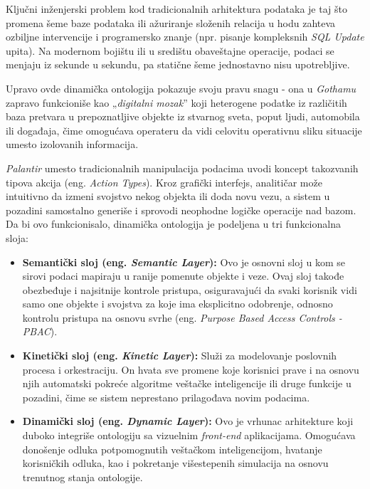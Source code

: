 ﻿\documentclass[12pt]{article}
\begin{document}
Ključni inženjerski problem kod tradicionalnih arhitektura podataka je taj što promena šeme baze podataka ili ažuriranje složenih relacija u hodu zahteva ozbiljne intervencije i programersko znanje (npr. pisanje kompleksnih \textit{SQL Update} upita).
Na modernom bojištu ili u središtu obaveštajne operacije, podaci se menjaju iz sekunde u sekundu, pa statične šeme jednostavno nisu upotrebljive.

Upravo ovde dinamička ontologija pokazuje svoju pravu snagu - ona u \textit{Gothamu} zapravo funkcioniše kao „\textit{digitalni mozak}” koji heterogene podatke iz različitih baza pretvara u prepoznatljive objekte iz stvarnog sveta, poput ljudi, automobila ili događaja, čime omogućava operateru da vidi celovitu operativnu sliku situacije umesto izolovanih informacija.

\textit{Palantir} umesto tradicionalnih manipulacija podacima uvodi koncept takozvanih tipova akcija (eng. \textit{Action Types}).
Kroz grafički interfejs, analitičar može intuitivno da izmeni svojstvo nekog objekta ili doda novu vezu, a sistem u pozadini samostalno generiše i sprovodi neophodne logičke operacije nad bazom.
Da bi ovo funkcionisalo, dinamička ontologija je podeljena u tri funkcionalna sloja:

\begin{itemize}
    \item \textbf{Semantički sloj (eng. \textit{Semantic Layer}):} Ovo je osnovni sloj u kom se sirovi podaci mapiraju u ranije pomenute objekte i veze.
    Ovaj sloj takođe obezbeđuje i najsitnije kontrole pristupa, osiguravajući da svaki korisnik vidi samo one objekte i svojstva za koje ima eksplicitno odobrenje, odnosno kontrolu pristupa na osnovu svrhe (eng. \textit{Purpose Based Access Controls - PBAC}).
    \item \textbf{Kinetički sloj (eng. \textit{Kinetic Layer}):} Služi za modelovanje poslovnih procesa i orkestraciju.
    On hvata sve promene koje korisnici prave i na osnovu njih automatski pokreće algoritme veštačke inteligencije ili druge funkcije u pozadini, čime se sistem neprestano prilagođava novim podacima.
    \item \textbf{Dinamički sloj (eng. \textit{Dynamic Layer}):} Ovo je vrhunac arhitekture koji duboko integriše ontologiju sa vizuelnim \textit{front-end} aplikacijama.
    Omogućava donošenje odluka potpomognutih veštačkom inteligencijom, hvatanje korisničkih odluka, kao i pokretanje višestepenih simulacija na osnovu trenutnog stanja ontologije.
\end{itemize}
\end{document}
